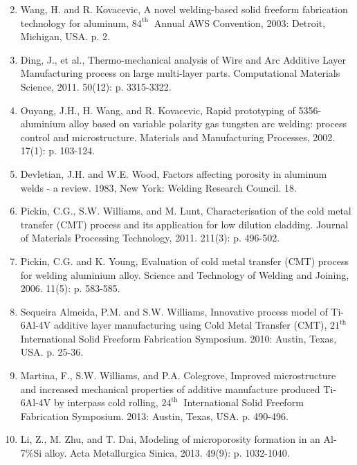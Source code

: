 \documentclass[10pt]{article}
\begin{document}
\begin{enumerate}
  \setcounter{enumi}{1}
  \item Wang, H. and R. Kovacevic, A novel welding-based solid freeform fabrication technology for aluminum, $84^{\text {th }}$ Annual AWS Convention, 2003: Detroit, Michigan, USA. p. 2.

  \item Ding, J., et al., Thermo-mechanical analysis of Wire and Arc Additive Layer Manufacturing process on large multi-layer parts. Computational Materials Science, 2011. 50(12): p. 3315-3322.

  \item Ouyang, J.H., H. Wang, and R. Kovacevic, Rapid prototyping of 5356- aluminium alloy based on variable polarity gas tungsten arc welding: process control and microstructure. Materials and Manufacturing Processes, 2002. 17(1): p. 103-124.

  \item Devletian, J.H. and W.E. Wood, Factors affecting porosity in aluminum welds - a review. 1983, New York: Welding Research Council. 18.

  \item Pickin, C.G., S.W. Williams, and M. Lunt, Characterisation of the cold metal transfer (CMT) process and its application for low dilution cladding. Journal of Materials Processing Technology, 2011. 211(3): p. 496-502.

  \item Pickin, C.G. and K. Young, Evaluation of cold metal transfer (CMT) process for welding aluminium alloy. Science and Technology of Welding and Joining, 2006. 11(5): p. 583-585.

  \item Sequeira Almeida, P.M. and S.W. Williams, Innovative process model of Ti-6Al-4V additive layer manufacturing using Cold Metal Transfer (CMT), $21^{\text {th }}$ International Solid Freeform Fabrication Symposium. 2010: Austin, Texas, USA. p. 25-36.

  \item Martina, F., S.W. Williams, and P.A. Colegrove, Improved microstructure and increased mechanical properties of additive manufacture produced Ti-6Al-4V by interpass cold rolling, $24^{\text {th }}$ International Solid Freeform Fabrication Symposium. 2013: Austin, Texas, USA. p. 490-496.

  \item Li, Z., M. Zhu, and T. Dai, Modeling of microporosity formation in an Al-7\%Si alloy. Acta Metallurgica Sinica, 2013. 49(9): p. 1032-1040.


\end{enumerate}
\end{document}
